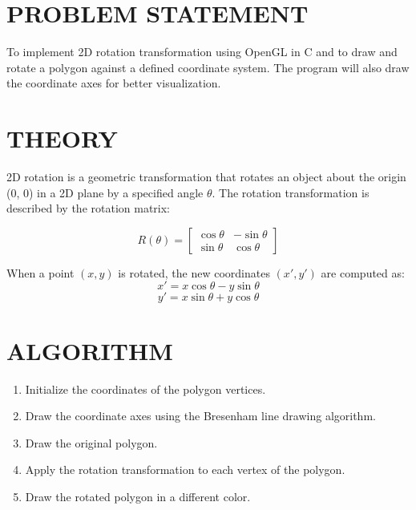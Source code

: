 \documentclass{article}
\begin{document}
\section*{PROBLEM STATEMENT}
To implement 2D rotation transformation using OpenGL in C and to draw and rotate a polygon against a defined coordinate system. The program will also draw the coordinate axes for better visualization.

\section*{THEORY}
2D rotation is a geometric transformation that rotates an object about the origin (0, 0) in a 2D plane by a specified angle \(\theta\). The rotation transformation is described by the rotation matrix:

\[
R(\theta) = \begin{bmatrix}
\cos\theta & -\sin\theta \\
\sin\theta & \cos\theta
\end{bmatrix}
\]

When a point \((x, y)\) is rotated, the new coordinates \((x', y')\) are computed as:
\[
x' = x \cos\theta - y \sin\theta
\]
\[
y' = x \sin\theta + y \cos\theta
\]

\section*{ALGORITHM}

\begin{enumerate}
    \item Initialize the coordinates of the polygon vertices.
    \item Draw the coordinate axes using the Bresenham line drawing algorithm.
    \item Draw the original polygon.
    \item Apply the rotation transformation to each vertex of the polygon.
    \item Draw the rotated polygon in a different color.
\end{enumerate}
\end{document}
